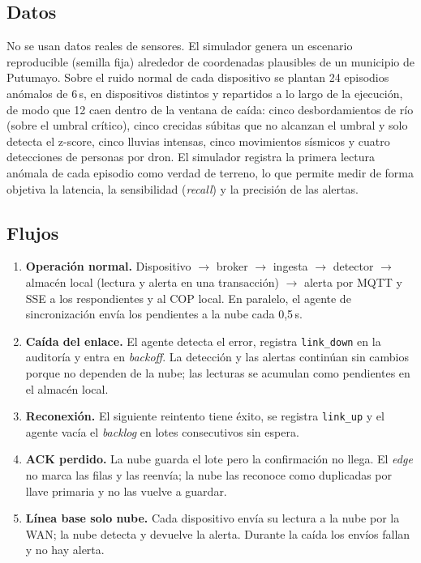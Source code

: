 \subsection{Datos}

No se usan datos reales de sensores. El simulador genera un escenario
reproducible (semilla fija) alrededor de coordenadas plausibles de un
municipio de Putumayo. Sobre el ruido normal de cada dispositivo se plantan 24
episodios anómalos de 6\,s, en dispositivos distintos y repartidos a lo largo
de la ejecución, de modo que 12 caen dentro de la ventana de caída: cinco
desbordamientos de río (sobre el umbral crítico), cinco crecidas súbitas que
no alcanzan el umbral y solo detecta el z-score, cinco lluvias intensas, cinco
movimientos sísmicos y cuatro detecciones de personas por dron. El simulador
registra la primera lectura anómala de cada episodio como verdad de terreno,
lo que permite medir de forma objetiva la latencia, la sensibilidad
(\emph{recall}) y la precisión de las alertas.

\subsection{Flujos}

\begin{enumerate}[leftmargin=*]
  \item \textbf{Operación normal.} Dispositivo $\rightarrow$ broker
        $\rightarrow$ ingesta $\rightarrow$ detector $\rightarrow$ almacén
        local (lectura y alerta en una transacción) $\rightarrow$ alerta por
        MQTT y SSE a los respondientes y al COP local. En paralelo, el agente
        de sincronización envía los pendientes a la nube cada 0,5\,s.
  \item \textbf{Caída del enlace.} El agente detecta el error, registra
        \texttt{link\_down} en la auditoría y entra en \emph{backoff}. La
        detección y las alertas continúan sin cambios porque no dependen de la
        nube; las lecturas se acumulan como pendientes en el almacén local.
  \item \textbf{Reconexión.} El siguiente reintento tiene éxito, se registra
        \texttt{link\_up} y el agente vacía el \emph{backlog} en lotes
        consecutivos sin espera.
  \item \textbf{ACK perdido.} La nube guarda el lote pero la confirmación no
        llega. El \emph{edge} no marca las filas y las reenvía; la nube las
        reconoce como duplicadas por llave primaria y no las vuelve a guardar.
  \item \textbf{Línea base solo nube.} Cada dispositivo envía su lectura a la
        nube por la WAN; la nube detecta y devuelve la alerta. Durante la caída
        los envíos fallan y no hay alerta.
\end{enumerate}

